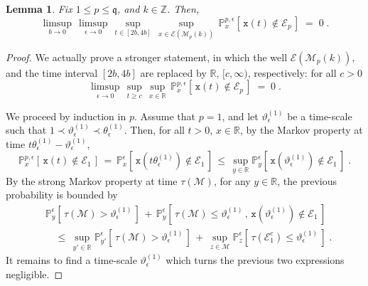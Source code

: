\documentclass[reqno]{amsart}
\theoremstyle{plain}
\newtheorem{lemma}[theorem]{Lemma}
\theoremstyle{definition}
\newcommand{\mc}[1]{{\mathcal #1}}
\newcommand{\mf}[1]{{\mathfrak #1}}
\newcommand{\bb}[1]{{\mathbb #1}}
\newcommand{\ms}[1]{{\mathscr #1}}
\newcommand{\mtt}[1]{{\mathtt #1}}
\newcommand{\<}{\langle}
\renewcommand{\>}{\rangle}
\begin{document}
\begin{lemma}
\label{l09}
Fix $1\le p\le\mf q$, and $k\in\bb Z$.  Then,
\begin{equation*}
\limsup_{b\rightarrow0}\, \limsup_{\epsilon\to0}\,
\sup_{t\in [2b,4b]}\, \sup_{x\in\ms E(\ms M_p(k))}\,
\bb P_{x}^{p, \epsilon}    [\, \mtt x(t) \notin\ms E_p \, ] \;=\; 0\;.
\end{equation*}
\end{lemma}

\begin{proof}
We actually prove a stronger statement, in which the well
$\ms E(\ms M_p(k))$, and the time interval $[2b,4b]$ are replaced by
$\bb R$, $[c,\infty)$, respectively: for all $c>0$
\begin{equation}
\label{33}
\limsup_{\epsilon\to0}\,
\sup_{t\ge c}\, \sup_{x\in \bb R}\,
\bb P_{x}^{p, \epsilon}    [\, \mtt x(t) \notin\ms E_p \, ] \;=\; 0\;.
\end{equation}

We proceed by induction in $p$. Assume that $p=1$, and let
$\vartheta^{(1)}_\epsilon$ be a time-scale such that
$1\prec \vartheta^{(1)}_\epsilon \prec \theta^{(1)}_\epsilon$. Then,
for all $t>0$, $x\in\bb R$, by the Markov property at time
$t\theta^{(1)}_\epsilon - \vartheta^{(1)}_\epsilon$,
\begin{equation*}
\bb P_{x}^{p, \epsilon}    [\, \mtt x(t) \notin\ms E_1 \, ] \,=\,
\bb P_{x}^{\epsilon}    [\, \mtt x(t\theta^{(1)}_\epsilon)
\notin\ms E_1 \, ] \,\le\,
\sup_{y\in\bb R} \bb P_{y}^{\epsilon} [\, \mtt x(\vartheta^{(1)}_\epsilon)
\notin\ms E_1 \, ]\;.
\end{equation*}
By the strong Markov property at time $\tau (\mc M)$, for any
$y\in\bb R$, the previous probability is bounded by
\begin{equation*}
\begin{aligned}
& \bb P_{y}^{\epsilon} [\, \tau (\mc M) > \vartheta^{(1)}_\epsilon \, ]
\,+\,
\bb P_{y}^{\epsilon} [\, \tau (\mc M) \le \vartheta^{(1)}_\epsilon
\,,\, \mtt x(\vartheta^{(1)}_\epsilon) \notin\ms E_1 \, ]
\\
&\quad
\le\, \sup_{y'\in \bb R}
\bb P_{y'}^{\epsilon} [\, \tau (\mc M) > \vartheta^{(1)}_\epsilon \, ]
\,+\, \sup_{z\in \mc M}
\bb P_{z}^{\epsilon} [\, \tau (\ms E^c_1) \le \vartheta^{(1)}_\epsilon \, ] \;.
\end{aligned}
\end{equation*}
It remains to find a time-scale $\vartheta^{(1)}_\epsilon$ which turns
the previous two expressions negligible.


\end{proof}
\end{document}
